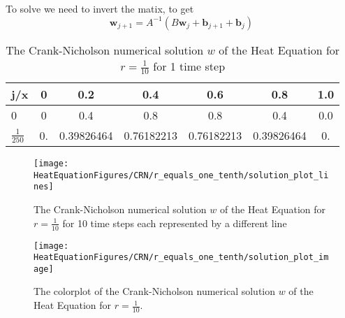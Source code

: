 \begin{example}
To solve we need to invert the matix, to get
\[ \mathbf{w}_{j+1}=A^{-1}(B\mathbf{w}_{j} +\mathbf{b}_{j+1}+\mathbf{b}_{j}) \]


\begin{center}
 \begin{table}[H]
 \caption{The Crank-Nicholson numerical solution $w$ of the Heat Equation for $r=\frac{1}{10}$ for 1 time step}
 \centering
\begin{tabular}{l|cccccc}
j/x&0&0.2&0.4&0.6&0.8&1.0\\ \hline
0&0&0.4&0.8&0.8&0.4&0.0\\
$\frac{1}{250}$&
 0.   &       0.39826464  &0.76182213 & 0.76182213 & 0.39826464&  0.
\end{tabular}
\end{table}
\end{center}

\begin{figure}[H]
  \caption{The Crank-Nicholson numerical solution $w$ of the Heat Equation for $r=\frac{1}{10}$ for 10 time steps each represented by a different line}
  \centering
    \texttt{[image: HeatEquationFigures/CRN/r\_equals\_one\_tenth/solution\_plot\_lines]}
\end{figure}


\begin{figure}[H]
  \caption{The colorplot of the Crank-Nicholson numerical solution $w$ of the Heat Equation for $r=\frac{1}{10}$.}
  \centering
    \texttt{[image: HeatEquationFigures/CRN/r\_equals\_one\_tenth/solution\_plot\_image]}
\end{figure}

\end{example}
